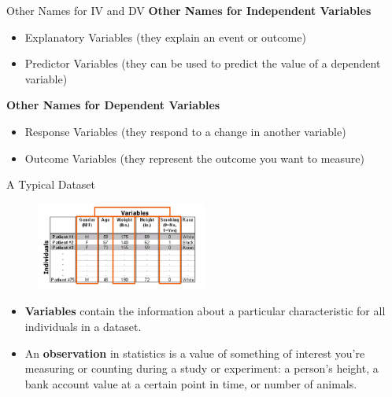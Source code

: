 \begin{frame}[t]{Other Names for IV and DV}
	\textbf{Other Names for Independent Variables}
	\begin{itemize}
		\item Explanatory Variables (they explain an event or outcome)
		\item Predictor Variables (they can be used to predict the value of a 
		dependent variable)
	\end{itemize} 
	\textbf{Other Names for Dependent Variables}
	\begin{itemize}
	\item Response Variables (they respond to a change in another variable)
	\item Outcome Variables (they represent the outcome you want to measure)
 \end{itemize}
\end{frame}


\begin{frame}[t]{A Typical Dataset}
	\begin{figure} [ht]
		\centering
		\includegraphics[width=0.5\textwidth]{stats_img/dataset.png}
	\end{figure}

\begin{itemize}
	\item \textbf{Variables} contain the information about a particular 
	characteristic 
	for all individuals in a dataset.
	\item An \textbf{observation} in statistics is a value of something of 
	interest you're measuring or counting during a study or experiment: a 
	person's height, a bank account value at a certain point in time, or number 
	of animals.
\end{itemize}

\end{frame}






